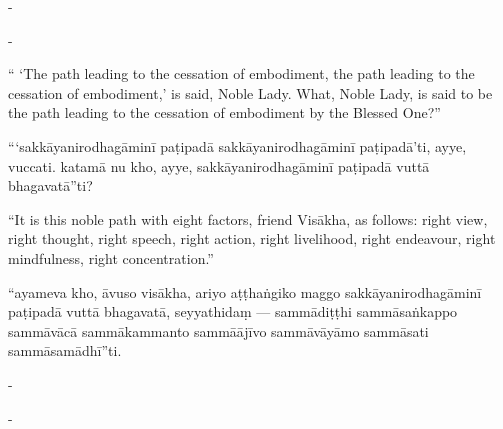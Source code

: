 \begin{samepage}
\begin{leftcolumn*}
-
\end{leftcolumn*}

\begin{rightcolumn}
-
\end{rightcolumn}
\end{samepage}

\begin{samepage}
\begin{leftcolumn*}
“ ‘The path leading to the cessation of embodiment, the path leading to the cessation of embodiment,’ is said, Noble Lady. What, Noble Lady, is said to be the path leading to the cessation of embodiment by the Blessed One?”
\end{leftcolumn*}

\begin{rightcolumn}
“‘sakkāyanirodhagāminī paṭipadā sakkāyanirodhagāminī paṭipadā’ti, ayye, vuccati. katamā nu kho, ayye, sakkāyanirodhagāminī paṭipadā vuttā bhagavatā”ti?
\end{rightcolumn}
\end{samepage}

\begin{samepage}
\begin{leftcolumn*}
“It is this noble path with eight factors, friend Visākha, as follows: right view, right thought, right speech, right action, right livelihood, right endeavour, right mindfulness, right concentration.”
\end{leftcolumn*}

\begin{rightcolumn}
“ayameva kho, āvuso visākha, ariyo aṭṭhaṅgiko maggo sakkāyanirodhagāminī paṭipadā vuttā bhagavatā, seyyathidaṃ — sammādiṭṭhi sammāsaṅkappo sammāvācā sammākammanto sammāājīvo sammāvāyāmo sammāsati sammāsamādhī”ti.
\end{rightcolumn}
\end{samepage}

\begin{samepage}
\begin{leftcolumn*}
-
\end{leftcolumn*}

\begin{rightcolumn}
-
\end{rightcolumn}
\end{samepage}

